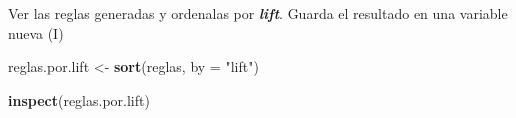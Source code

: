 \documentclass[
  ignorenonframetext,
]{beamer}
\newenvironment{Shaded}{\begin{snugshade}}{\end{snugshade}}
\newcommand{\DataTypeTok}[1]{\textcolor[rgb]{0.13,0.29,0.53}{#1}}
\newcommand{\KeywordTok}[1]{\textcolor[rgb]{0.13,0.29,0.53}{\textbf{#1}}}
\newcommand{\NormalTok}[1]{#1}
\newcommand{\StringTok}[1]{\textcolor[rgb]{0.31,0.60,0.02}{#1}}
\begin{document}
\begin{frame}[fragile]{Ver las reglas generadas y ordenalas por
\textbf{\emph{lift}}. Guarda el resultado en una variable nueva (I)}
\protect\hypertarget{ver-las-reglas-generadas-y-ordenalas-por-lift.-guarda-el-resultado-en-una-variable-nueva-i}{}

\begin{Shaded}
\begin{Highlighting}[]
\NormalTok{reglas.por.lift <-}\StringTok{ }\KeywordTok{sort}\NormalTok{(reglas, }\DataTypeTok{by =} \StringTok{"lift"}\NormalTok{) }
\end{Highlighting}
\end{Shaded}

\begin{Shaded}
\begin{Highlighting}[]
\KeywordTok{inspect}\NormalTok{(reglas.por.lift)}
\end{Highlighting}
\end{Shaded}


\end{frame}
\end{document}
